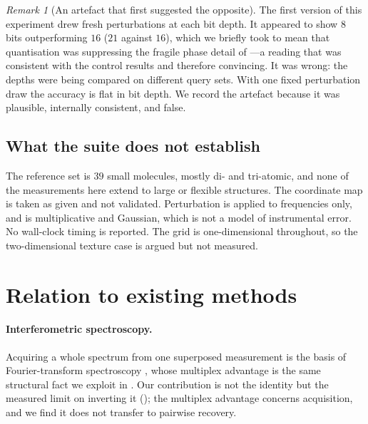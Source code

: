 \documentclass[11pt,twocolumn,a4paper]{article}
\theoremstyle{upthm}
\theoremstyle{definition}
\theoremstyle{remark}
\newtheorem{remark}[theorem]{Remark}
\begin{document}
\begin{remark}[An artefact that first suggested the opposite]
\label{rem:rngartefact}
The first version of this experiment drew fresh perturbations at each bit
depth. It appeared to show $8$ bits outperforming $16$ ($21$ against
$16$), which we briefly took to mean that quantisation was suppressing
the fragile phase detail of ---a reading that was
consistent with the control results and therefore convincing. It was
wrong: the depths were being compared on different query sets. With one
fixed perturbation draw the accuracy is flat in bit depth. We record the
artefact because it was plausible, internally consistent, and false.
\end{remark}

\subsection{What the suite does not establish}

The reference set is $39$ small molecules, mostly di- and tri-atomic, and
none of the measurements here extend to large or flexible structures. The
coordinate map is taken as given and not validated. Perturbation is
applied to frequencies only, and is multiplicative and Gaussian, which is
not a model of instrumental error. No wall-clock timing is reported. The
grid is one-dimensional throughout, so the two-dimensional texture case
is argued but not measured.



\section{Relation to existing methods}
\label{sec:related}

\paragraph{Interferometric spectroscopy.} Acquiring a whole spectrum from
one superposed measurement is the basis of Fourier-transform
spectroscopy \citep{griffiths2007}, whose multiplex advantage
\citep{fellgett1949} is the same structural fact we exploit in
. Our contribution is not the identity but the measured
limit on inverting it (); the multiplex advantage
concerns acquisition, and we find it does not transfer to pairwise
recovery.
\end{document}

